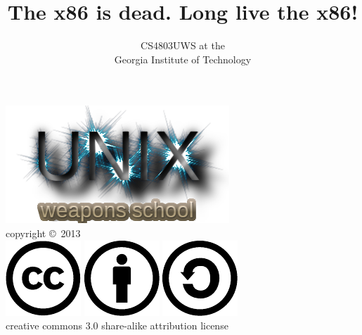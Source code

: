 \documentclass[mathserif,xcolor={dvipsnames,table}]{beamer}
\title{\textbf{The x86 is dead. Long live the x86!}}
\date{}
\author{CS4803UWS at the\\
Georgia Institute of Technology
}
\begin{document}
\begin{frame}
\titlepage
\begin{center}
\includegraphics[scale=0.33]{images/uws.png}\\
\vspace{.1in}
\tiny{copyright \copyright\ 2013}\\
\includegraphics[scale=.25]{images/cc-logo.pdf}
\includegraphics[scale=.25]{images/cc-new.pdf}
\includegraphics[scale=.25]{images/cc-share.pdf}\\
\tiny{creative commons 3.0 share-alike attribution license}
\end{center}
\end{frame}
\end{document}

